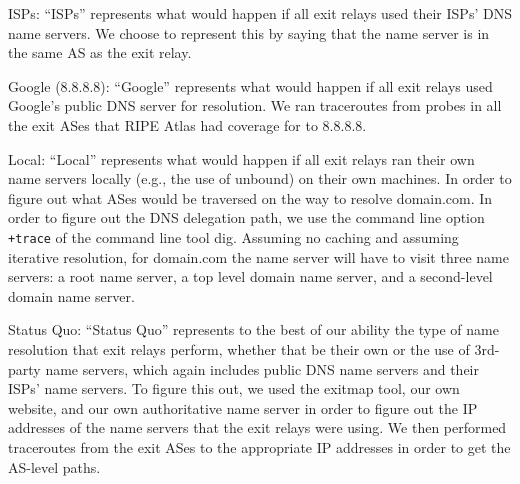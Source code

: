 ISPs: ``ISPs'' represents what would happen if all exit relays used their ISPs' DNS name 
servers.  We choose to represent this by saying that the name server is in the same AS as the 
exit relay.

Google (8.8.8.8): ``Google'' represents what would happen if all exit relays used 
Google's public DNS server for resolution. We ran traceroutes from probes in all the exit 
ASes that RIPE Atlas had coverage for to 8.8.8.8.

Local: ``Local'' represents what would happen if all exit relays ran their own name 
servers locally (e.g., the use of unbound) on their own machines. In order to figure out 
what ASes would be traversed on the way to resolve domain.com. In order to figure out the 
DNS delegation path, we use the command line option \texttt{+trace} of the
command line tool dig. Assuming no caching and assuming 
iterative resolution, for domain.com the name server will have to visit three name servers:
a root name server, a top level domain name server, and a second-level domain name server. 

Status Quo: ``Status Quo'' represents to the best of our ability the type of name resolution 
that exit relays perform, whether that be their own or the use of 3rd-party name servers, 
which again includes public DNS name servers and their ISPs' name servers. To figure this 
out, we used the exitmap tool, our own website, and our own authoritative name server 
in order to figure out the IP addresses of the name servers that the exit relays were 
using. We then performed traceroutes from the exit ASes to the appropriate IP addresses 
in order to get the AS-level paths.


